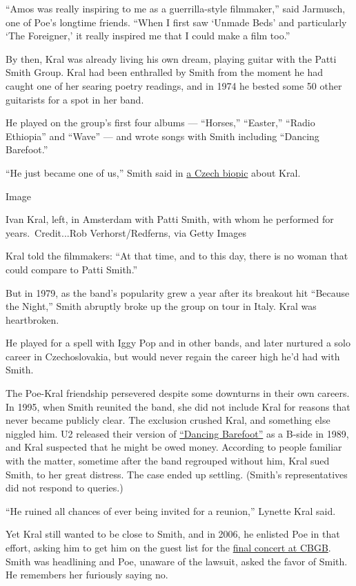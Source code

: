 ``Amos was really inspiring to me as a guerrilla-style filmmaker,'' said
Jarmusch, one of Poe's longtime friends. ``When I first saw `Unmade
Beds' and particularly `The Foreigner,' it really inspired me that I
could make a film too.''

By then, Kral was already living his own dream, playing guitar with the
Patti Smith Group. Kral had been enthralled by Smith from the moment he
had caught one of her searing poetry readings, and in 1974 he bested
some 50 other guitarists for a spot in her band.

He played on the group's first four albums --- ``Horses,'' ``Easter,''
``Radio Ethiopia'' and ``Wave'' --- and wrote songs with Smith including
``Dancing Barefoot.''

``He just became one of us,'' Smith said in
\href{https://www.youtube.com/watch?v=5z39lYLN6lg}{a Czech biopic} about
Kral.

Image

Ivan Kral, left, in Amsterdam with Patti Smith, with whom he performed
for years.~Credit...Rob Verhorst/Redferns, via Getty Images

Kral told the filmmakers: ``At that time, and to this day, there is no
woman that could compare to Patti Smith.''

But in 1979, as the band's popularity grew a year after its breakout hit
``Because the Night,'' Smith abruptly broke up the group on tour in
Italy. Kral was heartbroken.

He played for a spell with Iggy Pop and in other bands, and later
nurtured a solo career in Czechoslovakia, but would never regain the
career high he'd had with Smith.

The Poe-Kral friendship persevered despite some downturns in their own
careers. In 1995, when Smith reunited the band, she did not include Kral
for reasons that never became publicly clear. The exclusion crushed
Kral, and something else niggled him. U2 released their version of
\href{https://www.youtube.com/watch?v=FSSAmMwYK4s}{``Dancing Barefoot''}
as a B-side in 1989, and Kral suspected that he might be owed money.
According to people familiar with the matter, sometime after the band
regrouped without him, Kral sued Smith, to her great distress. The case
ended up settling. (Smith's representatives did not respond to queries.)

``He ruined all chances of ever being invited for a reunion,'' Lynette
Kral said.

Yet Kral still wanted to be close to Smith, and in 2006, he enlisted Poe
in that effort, asking him to get him on the guest list for the
\href{https://www.nytimes3xbfgragh.onion/2006/10/16/arts/music/16cbgb.html}{final
concert at CBGB}. Smith was headlining and Poe, unaware of the lawsuit,
asked the favor of Smith. He remembers her furiously saying no.

